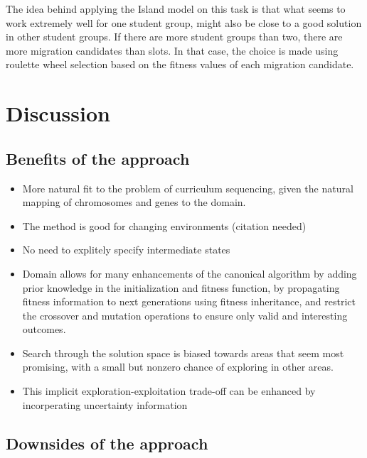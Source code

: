 The idea behind applying the Island model on this task is that what seems to work
extremely well for one student group, might also be close to a good solution in
other student groups. If there are more student groups than two, there are more
migration candidates than slots. In that case, the choice is made using
roulette wheel selection based on the fitness values of each migration
candidate.
\section{Discussion}
\label{approach_discussion}
\subsection{Benefits of the approach}
\begin{itemize}
	\item More natural fit to the problem of curriculum sequencing, given the
		natural mapping of chromosomes and genes to the domain.
	\item The method is good for changing environments (citation needed)
	\item No need to explitely specify intermediate states
	\item Domain allows for many enhancements of the canonical algorithm by
		adding prior knowledge in the initialization and fitness function, by
		propagating fitness information to next generations using fitness
		inheritance, and restrict the crossover and mutation operations to
		ensure only valid and interesting outcomes.
	\item Search through the solution space is biased towards areas that seem
		most promising, with a small but nonzero chance of exploring in other
		areas.
	\item This implicit exploration-exploitation trade-off can be enhanced by
		incorperating uncertainty information
\end{itemize}
\subsection{Downsides of the approach}
